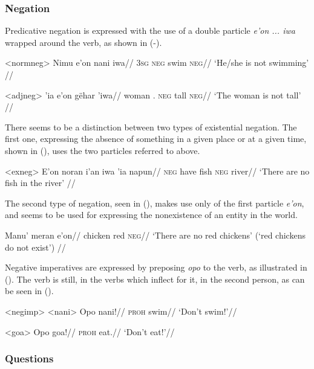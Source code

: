 \documentclass[../hewa_main-subfiles.tex]{subfiles}
\begin{document}
\subsubsection{Negation}\label{sec:neg}

Predicative negation is expressed with the use of a double particle \textit{e'on ... iwa} wrapped around the verb, as shown in (-).

\ex<normneg>
\begingl %
\gla Nimu e'on nani iwa//
\glb \textsc{3sg} \textsc{neg} swim \textsc{neg}//
\glft `He/she is not swimming' // 
\endgl
\xe

\ex<adjneg>
\begingl %
 'ia e'on gëhar 'iwa//
\glb woman \Def{}.\Sg{} \textsc{neg} tall \textsc{neg}//
\glft `The woman is not tall' // 
\endgl
\xe

There seems to be a distinction between two types of existential negation. The first one, expressing the absence of something in a given place or at a given time, shown in (), uses the two particles referred to above.

\ex<exneg>
\begingl %
\gla E'on noran i'an iwa 'ia napun//
\glb \textsc{neg} have fish \textsc{neg} \Loc{} river//
\glft `There are no fish in the river' // 
\endgl
\xe

The second type of negation, seen in (), makes use only of the first particle \textit{e'on}, and seems to be used for expressing the nonexistence of an entity in the world.

\begingl %
\gla Manu' meran e'on//
\glb chicken red \textsc{neg}//
\glft `There are no red chickens' (`red chickens do not exist') // 
\endgl
\xe

Negative imperatives are expressed by preposing \textit{opo} to the verb, as illustrated in (). The verb is still, in the verbs which inflect for it, in the second person, as can be seen in ().

\pex<negimp> %
\a<nani> %
\begingl %
\gla Opo nani!//
\glb \textsc{proh} swim//
\glft `Don't swim!'//
\endgl

\a<goa> %
\begingl %
\gla Opo goa!//
\glb \textsc{proh} eat.\Second{}\Sg{}//
\glft `Don't eat!'// 
\endgl
\xe

\subsubsection{Questions}
\end{document}
